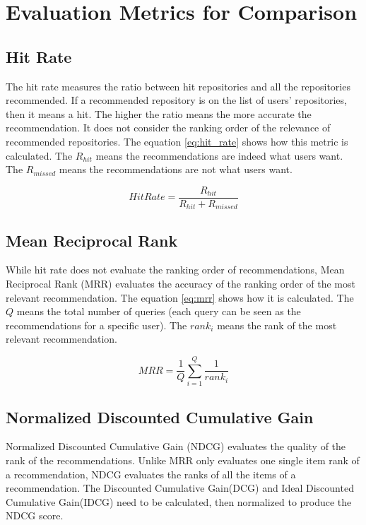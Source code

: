 \documentclass[11pt,twoside]{report}
\begin{document}
\section{Evaluation Metrics for Comparison}
\subsection{Hit Rate}
The hit rate measures the ratio between hit repositories and all the repositories recommended. If a recommended repository is on the list of users' repositories, then it means a hit. The higher the ratio means the more accurate the recommendation. It does not consider the ranking order of the relevance of recommended repositories. The equation \ref{eq:hit_rate} shows how this metric is calculated. The $R_{hit}$ means the recommendations are indeed what users want. The $R_{missed}$ means the recommendations are not what users want.

\begin{equation}
    HitRate=\frac{R_{hit}}{R_{hit}+R_{missed}}
    \label{eq:hit_rate}
\end{equation}

\subsection{Mean Reciprocal Rank}
While hit rate does not evaluate the ranking order of recommendations, Mean Reciprocal Rank (MRR) evaluates the accuracy of the ranking order of the most relevant recommendation. The equation \ref{eq:mrr} shows how it is calculated. The $Q$ means the total number of queries (each query can be seen as the recommendations for a specific user). The $rank_i$ means the rank of the most relevant recommendation.

\begin{equation}
    MRR=\frac{1}{Q}\sum_{i=1}^Q\frac{1}{rank_i}
    \label{eq:mrr}
\end{equation}

\subsection{Normalized Discounted Cumulative Gain}
Normalized Discounted Cumulative Gain (NDCG) evaluates the quality of the rank of the recommendations. Unlike MRR only evaluates one single item rank of a recommendation, NDCG evaluates the ranks of all the items of a recommendation. The Discounted Cumulative Gain(DCG) and Ideal Discounted Cumulative Gain(IDCG) need to be calculated, then normalized to produce the NDCG score. 
\end{document}
